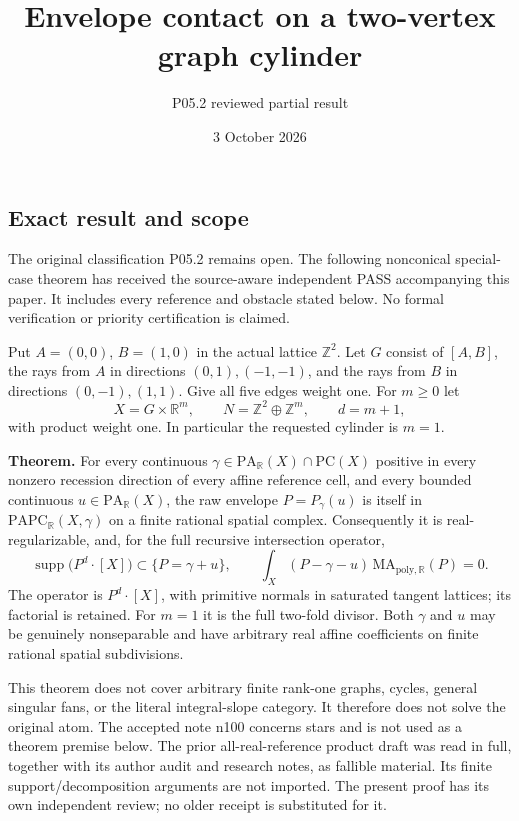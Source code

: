 \documentclass[
  11pt,
]{article}
\title{Envelope contact on a two-vertex graph cylinder}
\author{P05.2 reviewed partial result}
\date{3 October 2026}
\begin{document}
\maketitle

\subsection{Exact result and scope}\label{exact-result-and-scope}

The original classification P05.2 remains open. The following
nonconical special-case theorem has received the source-aware independent
PASS accompanying this paper. It includes every reference and obstacle
stated below. No formal verification or priority certification is claimed.

Put \(A=(0,0)\), \(B=(1,0)\) in the actual lattice \(\mathbb Z^2\). Let
\(G\) consist of \([A,B]\), the rays from \(A\) in directions
\((0,1),(-1,-1)\), and the rays from \(B\) in directions
\((0,-1),(1,1)\). Give all five edges weight one. For \(m\geq0\) let \[
X=G\times\mathbb R^m,\qquad N=\mathbb Z^2\oplus\mathbb Z^m,
\qquad d=m+1,
\] with product weight one. In particular the requested cylinder is
\(m=1\).

\textbf{Theorem.} For every continuous
\(\gamma\in\mathrm{PA}_{\mathbb R}(X)\cap\mathrm{PC}(X)\) positive in
every nonzero recession direction of every affine reference cell, and
every bounded continuous \(u\in\mathrm{PA}_{\mathbb R}(X)\), the raw
envelope \(P=P_\gamma(u)\) is itself in
\(\mathrm{PAPC}_{\mathbb R}(X,\gamma)\) on a finite rational spatial
complex. Consequently it is real-regularizable, and, for the full
recursive intersection operator, \[
\operatorname{supp}\bigl(P^d\cdot[X]\bigr)\subset\{P=\gamma+u\},
\qquad
\int_X(P-\gamma-u)\,\mathrm{MA}_{\mathrm{poly},\mathbb R}(P)=0.
\tag{T}
\] The operator is \(P^d\cdot[X]\), with primitive normals in saturated
tangent lattices; its factorial is retained. For \(m=1\) it is the full
two-fold divisor. Both \(\gamma\) and \(u\) may be genuinely
nonseparable and have arbitrary real affine coefficients on finite
rational spatial subdivisions.

This theorem does not cover arbitrary finite rank-one graphs, cycles,
general singular fans, or the literal integral-slope category. It
therefore does not solve the original atom. The accepted note n100
concerns stars and is not used as a theorem premise below. The prior
all-real-reference product draft was read in full, together with its
author audit and research notes, as fallible material. Its finite
support/decomposition arguments are not imported. The present proof has
its own independent review; no older receipt is substituted for it.
\end{document}
